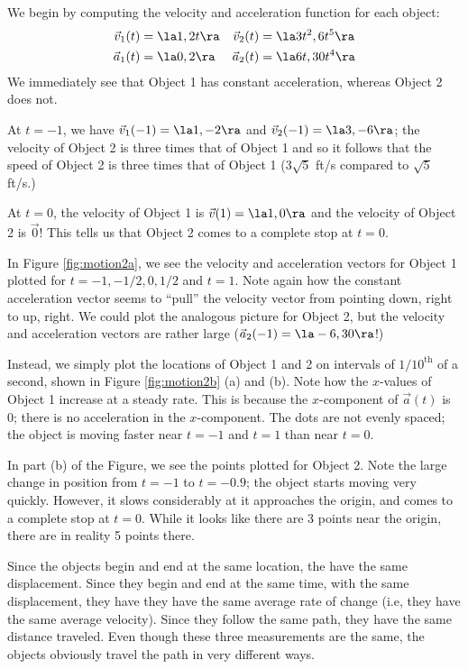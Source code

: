 {We begin by computing the velocity and acceleration function for each object:
\begin{align*}
\vec v_1(t) &= \la 1,2t\ra & \vec v_2(t) &= \la 3t^2,6t^5\ra \\
\vec a_1(t) &= \la 0,2\ra & \vec a_2(t) &=\la 6t,30t^4\ra
\end{align*}
We immediately see that Object 1 has constant acceleration, whereas Object 2 does not. 

At $t=-1$, we have $\vec v_1(-1) = \la 1,-2\ra$ and $\vec v_2(-1) = \la 3,-6\ra$; the velocity of Object 2 is three times that of Object 1 and so it follows that the speed of Object 2 is three times that of Object 1 ($3\sqrt{5}$ ft/s compared to $\sqrt{5}$ ft/s.)

At $t=0$, the velocity of Object 1 is $\vec v(1) = \la 1,0\ra$ and the velocity of Object 2 is $\vec 0$! This tells us that Object 2 comes to a complete stop at $t=0$. 

In Figure \ref{fig:motion2a}, we see the velocity and acceleration vectors for Object 1 plotted for $t=-1, -1/2, 0, 1/2$ and $t=1$. Note again how the constant acceleration vector seems to ``pull'' the velocity vector from pointing down, right to up, right. We could plot the analogous picture for Object 2, but the velocity and acceleration vectors are rather large ($\vec a_2(-1) = \la -6,30\ra$!) 

Instead, we simply plot the locations of Object 1 and 2  on intervals of $1/10^{\text{th}}$ of a second, shown in Figure \ref{fig:motion2b} (a) and (b). Note how the $x$-values of Object 1 increase at a steady rate. This is because the $x$-component of $\vec a(t)$ is 0; there is no acceleration in the $x$-component. The dots are not evenly spaced; the object is moving faster near $t=-1$ and $t=1$ than near $t=0$.


In part (b) of the Figure, we see the points plotted for Object 2. Note the large change in position from $t=-1$ to $t=-0.9$; the object starts moving very quickly. However, it slows considerably at it approaches the origin, and comes to a complete stop at $t=0$. While it looks like there are 3 points near the origin, there are in reality 5 points there.

Since the objects begin and end at the same location, the have the same displacement. Since they begin and end at the same time, with the same displacement, they have they have the same average rate of change (i.e, they have the same average velocity). Since they follow the same path, they have the same distance traveled. Even though these three measurements are the same, the objects obviously travel the path in very different ways.
}\\

